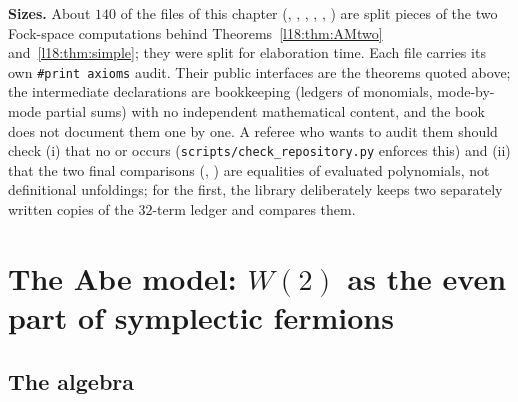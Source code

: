 \begin{warning}
\textbf{Sizes.} About $140$ of the files of this chapter (,
, , ,
, ) are split pieces of the two Fock-space
computations behind Theorems~\ref{l18:thm:AMtwo} and~\ref{l18:thm:simple}; they were split for elaboration
time. Each file carries its own \texttt{\#print axioms} audit. Their public interfaces are the theorems
quoted above; the intermediate declarations are bookkeeping (ledgers of monomials, mode-by-mode partial
sums) with no independent mathematical content, and the book does not document them one by one. A referee
who wants to audit them should check (i) that no  or  occurs
(\texttt{scripts/check\_repository.py} enforces this) and (ii) that the two final comparisons
(, ) are equalities of
evaluated polynomials, not definitional unfoldings; for the first, the library deliberately keeps two
separately written copies of the $32$-term ledger and compares them.
\end{warning}

\section{The Abe model: \texorpdfstring{$W(2)$}{W(2)} as the even part of symplectic fermions}\label{l18:sec:abe}

\subsection{The algebra}

